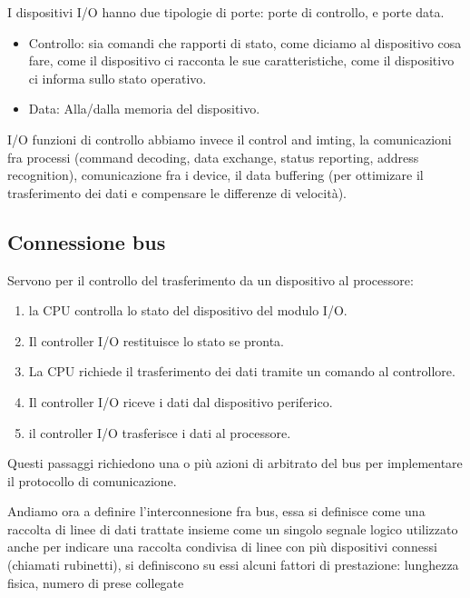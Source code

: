 \hspace{-15pt}I dispositivi I/O hanno due tipologie di porte: porte di controllo, e porte data.
\begin{itemize}
    \item Controllo: sia comandi che rapporti di stato, come diciamo al dispositivo cosa fare, come il dispositivo ci racconta le sue caratteristiche, come il dispositivo ci informa sullo stato operativo.
    \item Data: Alla/dalla memoria del dispositivo.
\end{itemize}

\hspace{-15pt}I/O funzioni di controllo abbiamo invece il control and imting, la comunicazioni fra processi (command decoding, data exchange, status reporting, address recognition), comunicazione
fra i device, il data buffering (per ottimizare il trasferimento dei dati e compensare le differenze di velocità).

\subsection{Connessione bus}
Servono per il controllo del trasferimento da un dispositivo al processore:
\begin{enumerate}
    \item la CPU controlla lo stato del dispositivo del modulo I/O.
    \item Il controller I/O restituisce lo stato se pronta.
    \item La CPU richiede il trasferimento dei dati tramite un comando al controllore.
    \item Il controller I/O riceve i dati dal dispositivo periferico.
    \item il controller I/O trasferisce i dati al processore.
\end{enumerate}

\hspace{-15pt}Questi passaggi richiedono una o più azioni di arbitrato del bus per implementare il protocollo di comunicazione.

Andiamo ora a definire l'interconnesione fra bus, essa si definisce come una raccolta di linee di dati trattate insieme come un singolo segnale logico
utilizzato anche per indicare una raccolta condivisa di linee con più dispositivi connessi (chiamati rubinetti), si definiscono su essi alcuni fattori di prestazione: lunghezza fisica, numero di prese collegate